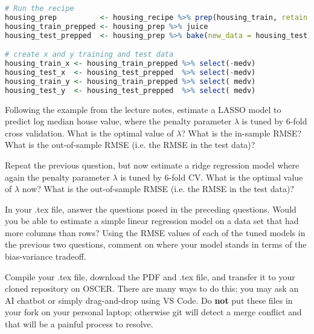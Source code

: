 \documentclass[12pt,english]{exam}
\begin{document}
\begin{questions}
\begin{lstlisting}[language=R]
# Run the recipe
housing_prep          <- housing_recipe %>% prep(housing_train, retain = TRUE)
housing_train_prepped <- housing_prep %>% juice
housing_test_prepped  <- housing_prep %>% bake(new_data = housing_test)

# create x and y training and test data
housing_train_x <- housing_train_prepped %>% select(-medv)
housing_test_x  <- housing_test_prepped  %>% select(-medv)
housing_train_y <- housing_train_prepped %>% select( medv)
housing_test_y  <- housing_test_prepped  %>% select( medv)
\end{lstlisting}

\question Following the example from the lecture notes, estimate a LASSO model to predict log median house value, where the penalty parameter $\lambda$ is tuned by 6-fold cross validation. What is the optimal value of $\lambda$? What is the in-sample RMSE? What is the out-of-sample RMSE (i.e. the RMSE in the test data)?

\question Repeat the previous question, but now estimate a ridge regression model where again the penalty parameter $\lambda$ is tuned by 6-fold CV. What is the optimal value of $\lambda$ now? What is the out-of-sample RMSE (i.e. the RMSE in the test data)? 


\question In your .tex file, answer the questions posed in the preceding questions. Would you be able to estimate a simple linear regression model on a data set that had more columns than rows? Using the RMSE values of each of the tuned models in the previous two questions, comment on where your model stands in terms of the bias-variance tradeoff.

\question Compile your .tex file, download the PDF and .tex file, and transfer it to your cloned repository on OSCER. There are many ways to do this;  you may ask an AI chatbot or simply drag-and-drop using VS Code. Do \textbf{not} put these files in your fork on your personal laptop; otherwise git will detect a merge conflict and that will be a painful process to resolve.


\end{questions}
\end{document}
